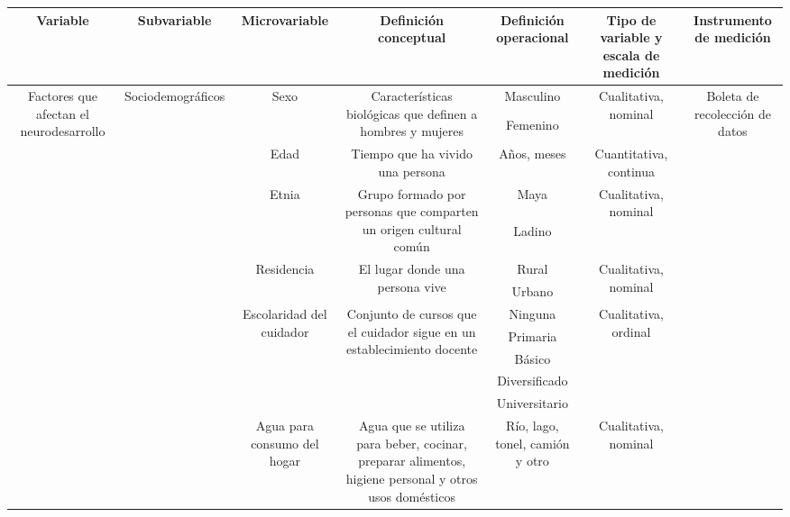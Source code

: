 \documentclass[11pt,letterpaper]{report}
\begin{document}
\begin{landscape}
\begin{longtable}{|c|c|c|c|c|c|c|}
\hline
Variable & Subvariable & Microvariable & Definición conceptual & Definición operacional & Tipo de variable y escala de medición & Instrumento de medición \\ \hline
\endfirsthead
%
\endhead
%
\multirow{48}{*}{Factores que afectan el neurodesarrollo} & \multirow{35}{*}{Sociodemográficos} & \multirow{2}{*}{Sexo} & \multirow{2}{*}{Características biológicas que definen a hombres y mujeres} & Masculino & \multirow{2}{*}{Cualitativa, nominal} & \multirow{48}{*}{Boleta de recolección de datos} \\ \cline{5-5}
 &  &  &  & Femenino &  &  \\ \cline{3-6}
 &  & Edad & Tiempo que ha vivido una persona & Años, meses & Cuantitativa, continua &  \\ \cline{3-6}
 &  & \multirow{2}{*}{Etnia} & \multirow{2}{*}{Grupo formado por personas que comparten un origen cultural común} & Maya & \multirow{2}{*}{Cualitativa, nominal} &  \\ \cline{5-5}
 &  &  &  & Ladino &  &  \\ \cline{3-6}
 &  & \multirow{2}{*}{Residencia} & \multirow{2}{*}{El lugar donde una persona vive} & Rural & \multirow{2}{*}{Cualitativa, nominal} &  \\ \cline{5-5}
 &  &  &  & Urbano &  &  \\ \cline{3-6}
 &  & \multirow{5}{*}{Escolaridad del cuidador} & \multirow{5}{*}{Conjunto de cursos que el cuidador sigue en un establecimiento docente} & Ninguna & \multirow{5}{*}{Cualitativa, ordinal} &  \\ \cline{5-5}
 &  &  &  & Primaria &  &  \\ \cline{5-5}
 &  &  &  & Básico &  &  \\ \cline{5-5}
 &  &  &  & Diversificado &  &  \\ \cline{5-5}
 &  &  &  & Universitario &  &  \\ \cline{3-6}
 &  & \multirow{4}{*}{Agua para consumo del hogar} & \multirow{4}{*}{Agua que se utiliza para beber, cocinar, preparar alimentos, higiene personal y otros usos domésticos} & Río, lago, tonel, camión y otro & \multirow{4}{*}{Cualitativa, nominal} &  \\ \cline{5-5}

\end{longtable}
\end{landscape}
\end{document}
